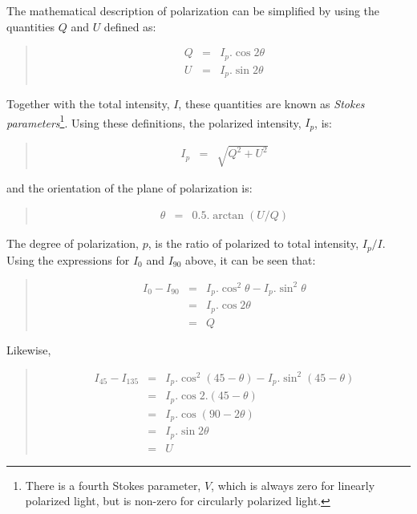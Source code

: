 \documentclass[twoside,11pt]{article}
\renewcommand{\_}{\texttt{\symbol{95}}}
\newenvironment{myquote}{\begin{quote}\begin{small}}{\end{small}\end{quote}}
\begin{document}
The mathematical description of polarization can be simplified by using 
the quantities $Q$ and $U$ defined as:
\begin{myquote}
\begin{eqnarray*}
  Q & = & I_{p}.\cos 2\theta \\
  U & = & I_{p}.\sin 2\theta \\
\end{eqnarray*}
\end{myquote}

Together with the total intensity, $I$, these quantities are known as 
\emph{Stokes parameters}\footnote{There is a fourth Stokes parameter, $V$, which is
always zero for linearly polarized light, but is non-zero for circularly
polarized light.}. Using these definitions, the polarized intensity, $I_{p}$, 
is:
\begin{myquote}
\begin{eqnarray*}
  I_{p} & = & \sqrt{ Q^{2} + U^{2} }
\end{eqnarray*}
\end{myquote}

and the orientation of the plane of polarization is:
\begin{myquote}
\begin{eqnarray*}
  \theta & = & 0.5.\arctan (U/Q)
\end{eqnarray*}
\end{myquote}

The degree of polarization, $p$, is the ratio of polarized to total
intensity, $I_{p}/I$. Using the expressions for $I_{0}$ and $I_{90}$
above, it can be seen that:
\begin{myquote}
\begin{eqnarray*}
  I_{0} - I_{90} & = & I_{p}.\cos^{2}\theta - I_{p}.\sin^{2}\theta \\
                 & = & I_{p}.\cos 2\theta \\
                 & = & Q
\end{eqnarray*}
\end{myquote}

Likewise,
\begin{myquote}
\begin{eqnarray*}
  I_{45} - I_{135} & = & I_{p}.\cos^{2}(45 - \theta) - I_{p}.\sin^{2}(45 - \theta) \\
                   & = & I_{p}.\cos 2.(45 - \theta) \\
                   & = & I_{p}.\cos (90 - 2\theta) \\
                   & = & I_{p}.\sin 2\theta \\
                   & = & U
\end{eqnarray*}
\end{myquote}
\end{document}
